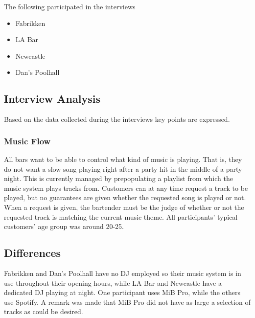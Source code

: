The following participated in the interviews

\begin{itemize}
  \item Fabrikken
  \item LA Bar
  \item Newcastle
  \item Dan's Poolhall
\end{itemize}


\subsection{Interview Analysis}
\label{sub:interview_analysis}

Based on the data collected during the interviews key points are expressed.

\subsubsection{Music Flow}
\label{ssub:Music Flow}


All bars want to be able to control what kind of music is playing. That is, they do not want a slow song playing right after a party hit in the middle of a party night. This is currently managed by prepopulating a playlist from which the music system plays tracks from. Customers can at any time request a track to be played, but no guarantees are given whether the requested song is played or not. When a request is given, the bartender must be the judge of whether or not the requested track is matching the current music theme. All participants' typical customers' age group was around 20-25.

\subsection{Differences}
\label{sub:differences}
Fabrikken and Dan's Poolhall have no DJ employed so their music system is in use throughout their opening hours, while LA Bar and Newcastle have a dedicated DJ playing at night. One participant uses MiB Pro, while the others use Spotify. A remark was made that MiB Pro did not have as large a selection of tracks as could be desired.

